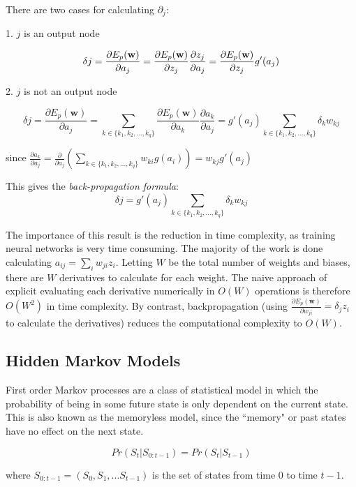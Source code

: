 \documentclass[12pt,a4,notitlepage]{report}
\renewcommand{\_}{\texttt{\symbol{95}}}
\newcommand{\<}{\texttt{\symbol{60}}}
\renewcommand{\>}{\texttt{\symbol{62}}}
\begin{document}
There are two cases for calculating $\partial_j$:

1. $j$ is an output node

\[
\delta j = \frac {\partial E_p (\mathbf w)} {\partial a_j} \\
 = \frac {\partial E_p (\mathbf w)} {\partial z_j} \frac {\partial z_j} {\partial a_j} \\
 = \frac {\partial E_p (\mathbf w)} {\partial z_j}  g'(a_j)
\]

2. $j$ is not an output node

\[
\delta j = \frac {\partial E_p (\mathbf w)} {\partial a_j}
 = \sum_{k \in \{k_1, k_2,\ldots,k_q\}} \frac {\partial E_p (\mathbf w)} {\partial a_k} \frac {\partial a_k} {\partial a_j}
 = g'(a_j) \sum_{k \in \{k_1, k_2,\ldots,k_q\}} {\delta_k w_{kj}}
\]

since $ \frac {\partial a_k} {\partial a_j} = \frac {\partial} {\partial a_j} \left( \sum_{k \in \{k_1, k_2,\ldots,k_q\}} { w_{ki} g(a_i) } \right) = w_{kj} g'(a_j) $

This gives the \textit{back-propagation formula}\cite{NeuralPat}:
\[
\delta j = g'(a_j) \sum_{k \in \{k_1, k_2,\ldots,k_q\}} {\delta_k w_{kj}}
\]

The importance of this result is the reduction in time complexity, as training neural networks is very time consuming. The majority of the work is done calculating $a_{ij} = \sum_i {w_{ji}z_i}$. Letting $W$ be the total number of weights and biases, there are $W$ derivatives to calculate for each weight. The naive approach of explicit evaluating each derivative numerically in $O(W)$ operations is therefore $O(W^2)$ in time complexity. By contrast,  backpropagation (using $\frac {\partial E_p(\mathbf w)} {\partial w_{ji}} = \delta_j z_i$ to calculate the derivatives) reduces the computational complexity to $O(W)$.

\subsection{Hidden Markov Models}

First order Markov processes are a class of statistical model in which the probability of being in some future state is only dependent on the current state. This is also known as the memoryless model, since the ``memory" or past states have no effect on the next state.\cite{AIModern}

\[ Pr(S_t|S_{0:t-1}) = Pr(S_t|S_{t-1}) \]

where $S_{0:t-1} = (S_0,S_1,...S_{t-1})$ is the set of states from time $0$ to time $t-1$.
\end{document}
